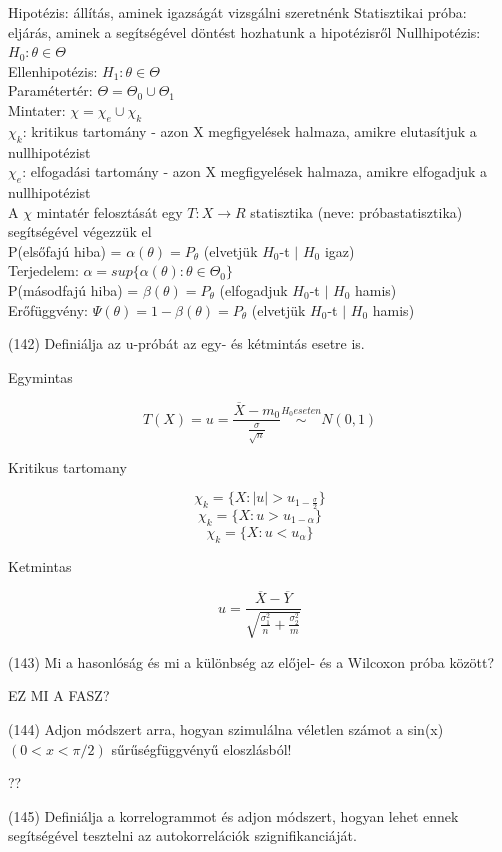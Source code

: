 \documentclass[12p]{article}
\begin{document}
Hipotézis: állítás, aminek igazságát vizsgálni szeretnénk
Statisztikai próba: eljárás, aminek a segítségével döntést hozhatunk a hipotézisről
Nullhipotézis: $H_0 : \theta \in \Theta$\\
Ellenhipotézis: $H_1 : \theta \in \Theta$\\
Paramétertér: $\Theta = \Theta_0 \cup \Theta_1$\\
Mintater: $\chi = \chi_e \cup \chi_k$\\
$\chi_k$: kritikus tartomány - azon X megfigyelések halmaza, amikre elutasítjuk a nullhipotézist\\
$\chi_e$: elfogadási tartomány - azon X megfigyelések halmaza, amikre elfogadjuk a nullhipotézist\\
A $\chi$ mintatér felosztását egy $T : X \rightarrow R$ statisztika (neve: próbastatisztika) segítségével végezzük el\\
P(elsőfajú hiba) = $\alpha(\theta) = P_\theta$ (elvetjük $H_0$-t $|$ $H_0$ igaz)\\
Terjedelem: $\alpha = sup\{\alpha(\theta) : \theta \in \Theta_0\}$\\
P(másodfajú hiba) = $\beta(\theta) = P_\theta$ (elfogadjuk $H_0$-t $|$ $H_0$ hamis)\\
Erőfüggvény: $\Psi(\theta) = 1 - \beta(\theta) = P_\theta$ (elvetjük $H_0$-t $|$ $H_0$ hamis)

(142)  Definiálja az u-próbát az egy- és kétmintás esetre is.

Egymintas

$$T(X) = u = \frac{\overline{X} - m_0}{\frac{\sigma}{\sqrt{n}}} \stackrel{H_0 eseten}{\sim} N(0, 1)$$

Kritikus tartomany

$$\chi_k = \{X: |u| > u_{1-\frac{\sigma}{2}}\}$$
$$\chi_k = \{X: u > u_{1-\alpha}\}$$
$$\chi_k = \{X: u < u_\alpha\}$$

Ketmintas

$$\displaystyle{u = \frac{\overline{X} - \overline{Y}}{\sqrt{\frac{\sigma_1^2}{n} + \frac{\sigma_2^2}{m}}}}$$

(143) Mi a hasonlóság és mi a különbség az előjel- és a Wilcoxon próba között?

EZ MI A FASZ?

(144) Adjon módszert arra, hogyan szimulálna véletlen számot a sin(x) $(0 < x < \pi/2)$ sűrűségfüggvényű eloszlásból!

??

(145) Definiálja a korrelogrammot és adjon módszert, hogyan lehet ennek segítségével tesztelni
az autokorrelációk szignifikanciáját.
\end{document}
